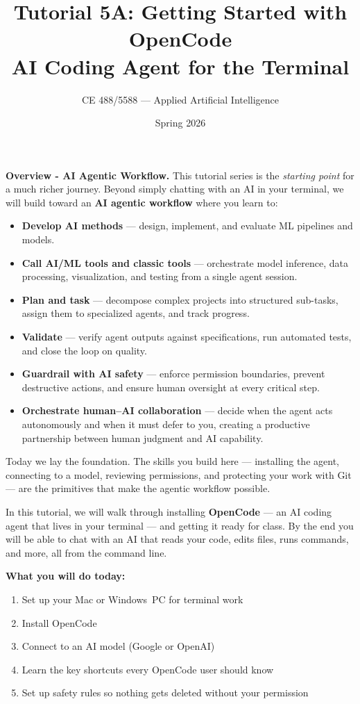 \documentclass[11pt]{article}
\title{\textbf{Tutorial 5A: Getting Started with OpenCode}\\[4pt]
       {\large AI Coding Agent for the Terminal}}
\author{CE 488/5588 --- Applied Artificial Intelligence}
\date{Spring 2026}
\begin{document}
\maketitle

\begin{def-box}
\textbf{Overview - AI Agentic Workflow.}
This tutorial series is the \emph{starting point} for a much richer journey.
Beyond simply chatting with an AI in your terminal, we will build toward an
\textbf{AI agentic workflow} where you learn to:
\begin{itemize}[nosep]
  \item \textbf{Develop AI methods} --- design, implement, and evaluate ML pipelines and models.
  \item \textbf{Call AI/ML tools and classic tools} --- orchestrate model inference, data processing, visualization, and testing from a single agent session.
  \item \textbf{Plan and task} --- decompose complex projects into structured sub-tasks, assign them to specialized agents, and track progress.
  \item \textbf{Validate} --- verify agent outputs against specifications, run automated tests, and close the loop on quality.
  \item \textbf{Guardrail with AI safety} --- enforce permission boundaries, prevent destructive actions, and ensure human oversight at every critical step.
  \item \textbf{Orchestrate human--AI collaboration} --- decide when the agent acts autonomously and when it must defer to you, creating a productive partnership between human judgment and AI capability.
\end{itemize}
Today we lay the foundation.  The skills you build here --- installing the agent, connecting to a model, reviewing permissions, and protecting your work with Git --- are the primitives that make the agentic workflow possible.
\end{def-box}

\begin{ch-box}
In this tutorial, we will walk through installing \textbf{OpenCode} --- an AI coding agent that lives in your terminal --- and getting it ready for class.  By the end you will be able to chat with an AI that reads your code, edits files, runs commands, and more, all from the command line.

\medskip\noindent\textbf{What you will do today:}
\begin{enumerate}[nosep]
  \item Set up your Mac or Windows~PC for terminal work
  \item Install OpenCode
  \item Connect to an AI model (Google or OpenAI)
  \item Learn the key shortcuts every OpenCode user should know
  \item Set up safety rules so nothing gets deleted without your permission
\end{enumerate}
\end{ch-box}
\end{document}

